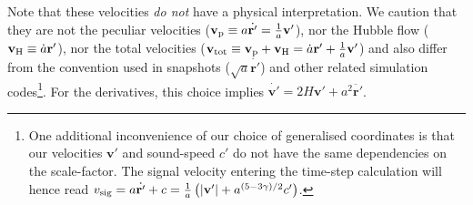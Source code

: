 Note that these velocities \emph{do not} have a physical
interpretation. We caution that they are not the peculiar velocities
($\mathbf{v}_{\rm p} \equiv a\dot{\mathbf{r}'} =
\frac{1}{a}\mathbf{v}'$), nor the Hubble flow
($\mathbf{v}_{\rm H} \equiv \dot{a}\mathbf{r}'$), nor the total
velocities
($\mathbf{v}_{\rm tot} \equiv \mathbf{v}_{\rm p} + \mathbf{v}_{\rm H}
= \dot{a}\mathbf{r}' + \frac{1}{a}\mathbf{v}'$) and also differ from
the convention used in \gadget snapshots
($\sqrt{a} \dot{\mathbf{r}'}$) and other related simulation
codes\footnote{One additional inconvenience of our choice of
  generalised coordinates is that our velocities $\mathbf{v}'$ and
  sound-speed $c'$ do not have the same dependencies on the
  scale-factor. The signal velocity entering the time-step calculation
  will hence read
  $v_{\rm sig} = a\dot{\mathbf{r}'} + c = \frac{1}{a} \left(
    |\mathbf{v}'| + a^{(5 - 3\gamma)/2}c'\right)$.}.  For the
derivatives, this choice implies
$\dot{\mathbf{v}'} = 2H\mathbf{v}' + a^2\ddot{\mathbf{r}'}$.



